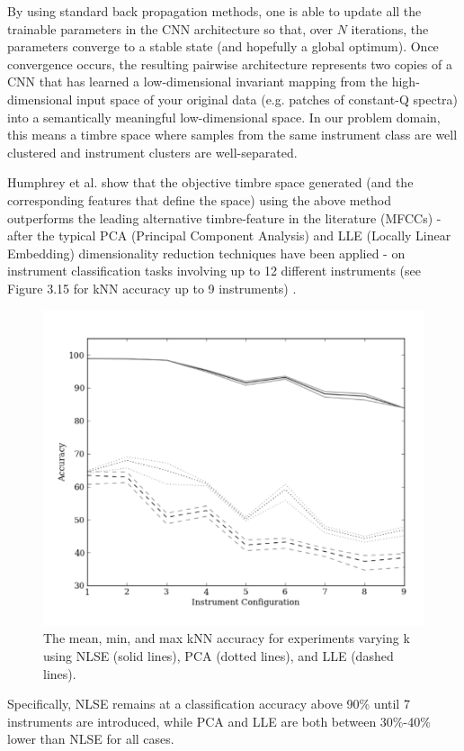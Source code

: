 \documentclass[12pt]{report} 	%
\numberwithin{figure}{chapter}
\numberwithin{table}{chapter}
\numberwithin{equation}{chapter}
\begin{document}
\begin{flushleft}
By using standard back propagation methods, one is able to update all the trainable parameters in the CNN architecture so that, over $N$ iterations, the parameters converge to a stable state (and hopefully a global optimum). Once convergence occurs, the resulting pairwise architecture represents two copies of a CNN that has learned a low-dimensional invariant mapping from the high-dimensional input space of your original data (e.g. patches of constant-Q spectra) into a semantically meaningful low-dimensional space. In our problem domain, this means a timbre space where samples from the same instrument class are well clustered and instrument clusters are well-separated.

Humphrey et al. show that the objective timbre space generated (and the corresponding features that define the space) using the above method outperforms the leading alternative timbre-feature in the literature (MFCCs) - after the typical PCA (Principal Component Analysis) and LLE (Locally Linear Embedding) dimensionality reduction techniques have been applied - on instrument classification tasks involving up to 12 different instruments (see Figure 3.15 for kNN accuracy up to 9 instruments) \cite{Humphrey:2000th}. \begin{figure}[h!]
\begin{center}
\includegraphics[scale=0.85]{CNN_kNN}
\caption[kNN accuracy for NLSE, PCA, and LLE]{The mean, min, and max kNN accuracy for experiments varying k using NLSE (solid lines), PCA (dotted lines), and LLE (dashed lines).}
\end{center}
\end{figure}
Specifically, NLSE remains at a classification accuracy above 90\% until 7 instruments are introduced, while PCA and LLE are both between 30\%-40\% lower than NLSE for all cases.


\end{flushleft}
\end{document}
